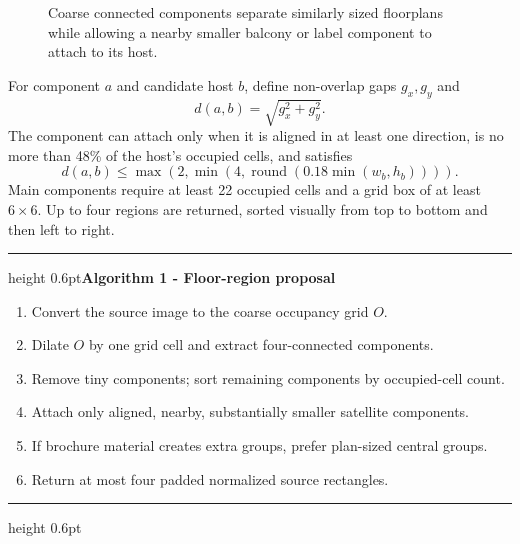 \documentclass[11pt,a4paper]{article}
\newenvironment{algorithmblock}[1]{
  \par\medskip\noindent\begin{minipage}{\textwidth}
  \color{Ink!55}\hrule height 0.6pt\vspace{1.4mm}\textbf{#1}\par\smallskip\color{Ink}
}{
  \vspace{1.2mm}\color{Ink!55}\hrule height 0.6pt\end{minipage}\par\medskip
}
\begin{document}
\begin{figure}[htbp]
\centering
{}
\caption{Coarse connected components separate similarly sized floorplans while allowing a nearby smaller balcony or label component to attach to its host.}
\label{fig:regions}
\end{figure}

For component $a$ and candidate host $b$, define non-overlap gaps $g_x,g_y$ and
\begin{equation}
d(a,b)=\sqrt{g_x^2+g_y^2}.
\end{equation}
The component can attach only when it is aligned in at least one direction, is no more than 48\% of the host's occupied cells, and satisfies
\begin{equation}
d(a,b)\leq \max\left(2,\min\left(4,\operatorname{round}(0.18\min(w_b,h_b))\right)\right).
\end{equation}
Main components require at least 22 occupied cells and a grid box of at least $6\times6$. Up to four regions are returned, sorted visually from top to bottom and then left to right.

\begin{algorithmblock}{Algorithm 1 - Floor-region proposal}
\begin{enumerate}
  \item Convert the source image to the coarse occupancy grid $O$.
  \item Dilate $O$ by one grid cell and extract four-connected components.
  \item Remove tiny components; sort remaining components by occupied-cell count.
  \item Attach only aligned, nearby, substantially smaller satellite components.
  \item If brochure material creates extra groups, prefer plan-sized central groups.
  \item Return at most four padded normalized source rectangles.
\end{enumerate}
\end{algorithmblock}
\end{document}
